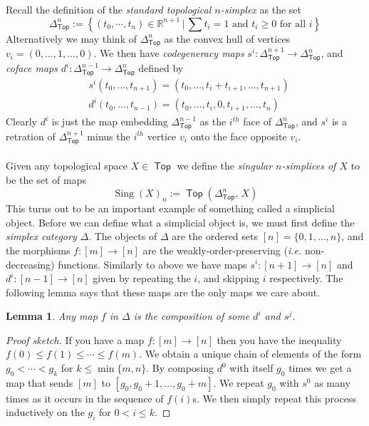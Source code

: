 \documentclass{amsart}
\DeclareMathOperator{\Sing}{Sing}
\DeclareMathOperator{\Top}{\mathsf{Top}}
\newtheorem{lemma}[theorem]{Lemma}
\theoremstyle{definition}
\begin{document}
Recall the definition of the \textit{standard topological $n$-simplex} as the set
$$
\Delta^n_{\Top} := \left\{ (t_0,\cdots, t_n)\in \mathbb{R}^{n+1} \, \Big| \,
  \sum t_i = 1 \text{ and } t_i\geq 0 \text{ for all }i \right\}
$$
Alternatively we may think of $\Delta^n_{\Top}$ as the convex hull of
vertices $v_i=(0,\ldots,1,\ldots,0)$.
We then have \textit{codegeneracy maps} $s^i:\Delta^{n+1}_{\Top} \to \Delta^n_{\Top}$,
and \textit{coface maps} $d^i: \Delta^{n-1}_{\Top} \to \Delta^n_{\Top}$ defined by
\begin{align*}
  & s^i(t_0,\ldots,t_{n+1}) = (t_0,\ldots,t_i+t_{i+1},\ldots,t_{n+1}) \\
  & d^i(t_0,\ldots,t_{n-1}) = (t_0,\ldots,t_i,0,t_{i+1},\ldots,t_n)
\end{align*}
Clearly $d^i$ is just the map embedding $\Delta^{n-1}_{\Top}$ as the $i^{th}$ face of $\Delta^{n}_{\Top}$, and $s^i$ is a retration of $\Delta^{n+1}_{\Top}$ minus the $i^{th}$ vertice $v_i$ onto
the face opposite $v_i$.
\\
\\
\indent
Given any topological space $X\in\Top$ we define the \textit{singular $n$-simplices of $X$} to be the set of maps
$$
\Sing(X)_n := \Top( \Delta^n_{\Top},\, X)
$$
This turns out to be an important example of something called a simplicial object.
Before we can define what a simplicial object is, we must first define the
\textit{simplex category} $\Delta$. The objects of $\Delta$ are the ordered sets
$[n]=\{0,1,\ldots,n\}$, and the morphisms $f:[m]\to[n]$ are the
weakly-order-preserving (\textit{i.e.} non-decreasing) functions. Similarly to
above we have maps $s^i:[n+1]\to [n]$ and $d^i:[n-1]\to [n]$ given by
repeating the $i$, and skipping $i$ respectively. The following lemma says
that these maps are the only maps we care about.
\begin{lemma}\label{compos}
  Any map $f$ in $\Delta$ is the composition of some $d^i$ and $s^j$.
\end{lemma}
\begin{proof}[Proof sketch]
  If you have a map $f:[m]\to[n]$ then you have the inequality $f(0)\leq f(1) \leq \cdots \leq f(m)$.
  We obtain a unique chain of elements of the form $g_0<\cdots < g_k$
  for $k\leq \min \{m,n\}$. By composing
  $d^0$ with itself $g_0$ times we get a map that sends $[m]$ to $[g_0,g_0+1,\ldots,g_0+m]$.
  We repeat $g_0$ with $s^0$ as many times as it occurs in the sequence of $f(i)$s. We then simply
  repeat this process inductively on the $g_i$ for $0 < i\leq k$.
\end{proof}
\end{document}
